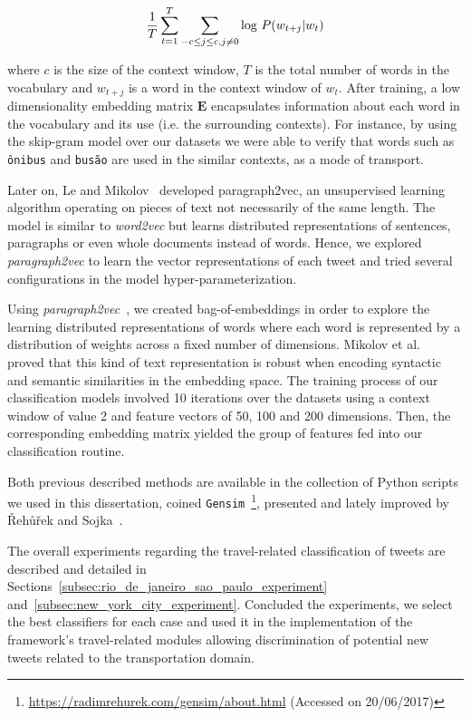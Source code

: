 \begin{equation}
\frac{1}{T}  \sum_{t=1}^{T}  \sum_{-c \leq j \leq  c, j \neq 0} \textnormal{log } P(w_{t+j} | w_t)
\end{equation}

where $c$ is the size of the context window, $T$ is the total number of words in the vocabulary and $w_{t+j}$ is a word in the context window of $w_t$. After training, a low dimensionality embedding matrix $\textbf{E}$ encapsulates information about each word in the vocabulary and its use (i.e. the surrounding contexts). For instance, by using the skip-gram model over our datasets we were able to verify that words such as \texttt{ônibus} and \texttt{busão} are used in the similar contexts, as a mode of transport.

Later on, Le and Mikolov~\cite{le2014distributed} developed paragraph2vec, an unsupervised learning algorithm operating on pieces of text not necessarily of the same length. The model is similar to \emph{word2vec} but learns distributed representations of sentences, paragraphs or even whole documents instead of words. Hence, we explored \emph{paragraph2vec} to learn the vector representations of each tweet and tried several configurations in the model hyper-parameterization.

Using \textit{paragraph2vec}~\cite{le2014distributed}, we created bag-of-embeddings in order to explore the learning distributed representations of words where each word is represented by a distribution of weights across a fixed number of dimensions. Mikolov et al.~\cite{mikolov2013linguistic} proved that this kind of text representation is robust when encoding syntactic and semantic similarities in the embedding space. The training process of our classification models involved 10 iterations over the datasets using a context window of value 2 and feature vectors of 50, 100 and 200 dimensions. Then, the corresponding embedding matrix yielded the group of features fed into our classification routine.

Both previous described methods are available in the collection of Python scripts we used in this dissertation, coined \texttt{Gensim}~\footnote{\url{https://radimrehurek.com/gensim/about.html} (Accessed on 20/06/2017)}, presented and lately improved by \v{R}eh\r{u}\v{r}ek and Sojka~\cite{rehurek2010software}.

The overall experiments regarding the travel-related classification of tweets are described and detailed in Sections~\ref{subsec:rio_de_janeiro_sao_paulo_experiment} and~\ref{subsec:new_york_city_experiment}. Concluded the experiments, we select the best classifiers for each case and used it in the implementation of the framework's travel-related modules allowing discrimination of potential new tweets related to the transportation domain.

